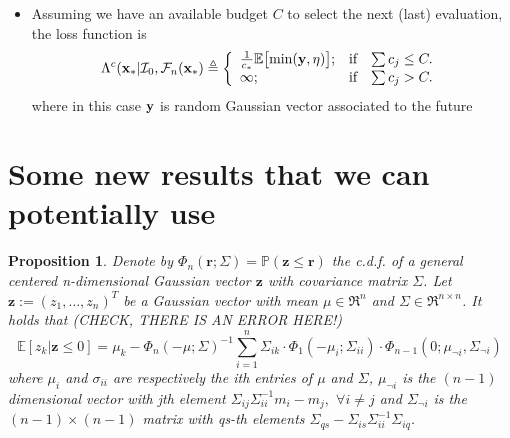 \documentclass{article} %
\newcommand{\I}{\mathcal{I}}
\newcommand{\E}{\mathbb{E}}
\newcommand{\Prob}{\mathbb{P}}
\newcommand{\future}{\mathcal{F}}
\newcommand{\bz}{\textbf{z}}
\newtheorem{proposition}{Proposition}
\begin{document}
\begin{itemize}
\item Assuming we have an available budget $C$ to select the next (last) evaluation, the loss function is 
$$\Lambda^c(\latentVector_*| \I_0,\future_{n}(\latentVector_*)\triangleq \left\{ \begin{array}{lcl}
 \frac1{c_*} \E \bigl[\min (\dataVector,\eta) \bigr];             & \mbox{if}  &  \sum c_j \leq C. \\
\infty; & \mbox{if}  & \sum c_j > C. \\
\end{array}
\right.$$
where in this case $\mathbf{y}$ is random Gaussian vector associated to the future 


\end{itemize}


 \section{Some new results that we can potentially use}

\begin{proposition}
Denote by  $\Phi_n (\textbf{r}; \Sigma) = \Prob(\bz \leq \textbf{r})$ the c.d.f. of a general  centered n-dimensional Gaussian vector $\bz$ with covariance matrix $\Sigma$. Let $\bz := (z_1,\dots,z_n)^T$ be a Gaussian vector with mean $\mu \in \Re^n$ and $\Sigma \in \Re^{n\times n}$. It holds that (CHECK, THERE IS AN ERROR HERE!)
\begin{equation} \nonumber
\E [ z_k|\bz \leq 0] = \mu_k -  \Phi_n ( -\mu; \Sigma)^{-1} \sum_{i=1}^n \Sigma_{ik} \cdot \Phi_1(-\mu_i;\Sigma_{ii}) \cdot \Phi_{n-1}(0;\mu_{\neg i}, \Sigma_{\neg i})
\end{equation}
 where $\mu_i$ and $\sigma_{ii}$ are respectively the ith entries of $\mu$ and $\Sigma$, $\mu_{\neg i}$ is the $(n-1)$ dimensional vector with jth element $\Sigma_{ij}\Sigma_{ii}^{-1}m_i -m_j,$ $\forall i\neq j$  and $\Sigma_{\neg i}$ is the $(n-1) \times (n-1)$ matrix with qs-th elements $\Sigma_{qs} - \Sigma_{is} \Sigma_{ii}^{-1} \Sigma_{iq}$.  
\end{proposition}
\end{document}
